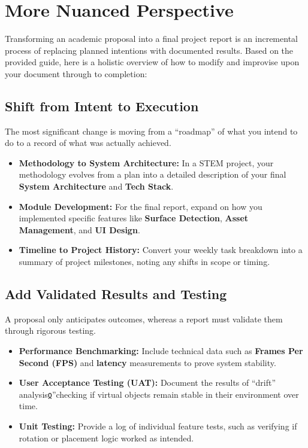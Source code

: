 \documentclass[twoside,12pt,openright]{report}
\begin{document}
\section{More Nuanced Perspective}

Transforming an academic proposal into a final project report is an incremental
process of replacing planned intentions with documented results. Based on the
provided guide, here is a holistic overview of how to modify and improvise upon
your document through to completion:

\subsection{Shift from Intent to Execution}

The most significant change is moving from a ``roadmap'' of what you intend to
do to a record of what was actually achieved.

\begin{itemize}
  \item \textbf{Methodology to System Architecture:} In a STEM project, your
    methodology evolves from a plan into a detailed description of your final
    \textbf{System Architecture} and \textbf{Tech Stack}.
  \item \textbf{Module Development:} For the final report, expand on how you
    implemented specific features like \textbf{Surface Detection},
    \textbf{Asset Management}, and \textbf{UI Design}.
  \item \textbf{Timeline to Project History:} Convert your weekly task breakdown
    into a summary of project milestones, noting any shifts in scope or timing.
\end{itemize}

\subsection{Add Validated Results and Testing}

A proposal only anticipates outcomes, whereas a report must validate them
through rigorous testing.

\begin{itemize}
  \item \textbf{Performance Benchmarking:} Include technical data such as
    \textbf{Frames Per Second (FPS)} and \textbf{latency} measurements to prove
    system stability.
  \item \textbf{User Acceptance Testing (UAT):} Document the results of
    ``drift'' analysisჲ”checking if virtual objects remain stable in their
    environment over time.
  \item \textbf{Unit Testing:} Provide a log of individual feature tests, such
    as verifying if rotation or placement logic worked as intended.
\end{itemize}
\end{document}

